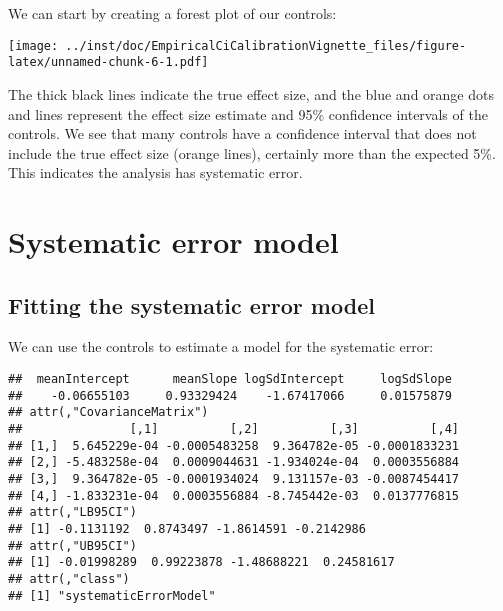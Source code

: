 \documentclass[]{article}
\newenvironment{Shaded}{\begin{snugshade}}{\end{snugshade}}
\newcommand{\KeywordTok}[1]{\textcolor[rgb]{0.13,0.29,0.53}{\textbf{#1}}}
\newcommand{\NormalTok}[1]{#1}
\newcommand{\OperatorTok}[1]{\textcolor[rgb]{0.81,0.36,0.00}{\textbf{#1}}}
\newcommand{\StringTok}[1]{\textcolor[rgb]{0.31,0.60,0.02}{#1}}
\begin{document}
We can start by creating a forest plot of our controls:

\begin{Shaded}
\end{Shaded}

\texttt{[image: ../inst/doc/EmpiricalCiCalibrationVignette\_files/figure-latex/unnamed-chunk-6-1.pdf]}

The thick black lines indicate the true effect size, and the blue and
orange dots and lines represent the effect size estimate and 95\%
confidence intervals of the controls. We see that many controls have a
confidence interval that does not include the true effect size (orange
lines), certainly more than the expected 5\%. This indicates the
analysis has systematic error.

\hypertarget{systematic-error-model}{%
\section{Systematic error model}\label{systematic-error-model}}

\hypertarget{fitting-the-systematic-error-model}{%
\subsection{Fitting the systematic error
model}\label{fitting-the-systematic-error-model}}

We can use the controls to estimate a model for the systematic error:

\begin{Shaded}
\end{Shaded}

\begin{verbatim}
##  meanIntercept      meanSlope logSdIntercept     logSdSlope 
##    -0.06655103     0.93329424    -1.67417066     0.01575879 
## attr(,"CovarianceMatrix")
##               [,1]          [,2]          [,3]          [,4]
## [1,]  5.645229e-04 -0.0005483258  9.364782e-05 -0.0001833231
## [2,] -5.483258e-04  0.0009044631 -1.934024e-04  0.0003556884
## [3,]  9.364782e-05 -0.0001934024  9.131157e-03 -0.0087454417
## [4,] -1.833231e-04  0.0003556884 -8.745442e-03  0.0137776815
## attr(,"LB95CI")
## [1] -0.1131192  0.8743497 -1.8614591 -0.2142986
## attr(,"UB95CI")
## [1] -0.01998289  0.99223878 -1.48688221  0.24581617
## attr(,"class")
## [1] "systematicErrorModel"
\end{verbatim}
\end{document}
